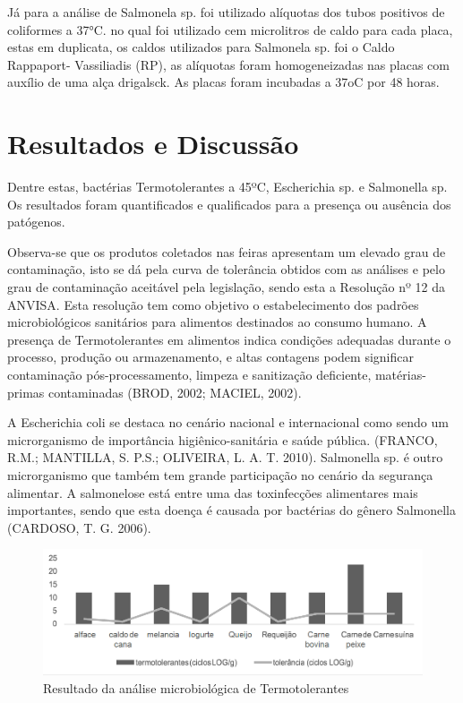 \documentclass[article,12pt,onesidea,4paper,english,brazil]{abntex2}
\begin{document}
Já para a análise de Salmonela sp. foi utilizado alíquotas dos tubos positivos de coliformes a 37°C. no qual foi utilizado cem microlitros de caldo para cada placa, estas em duplicata, os caldos utilizados para Salmonela sp. foi o Caldo Rappaport- Vassiliadis (RP), as alíquotas foram homogeneizadas nas placas com auxílio de uma alça drigalsck. As placas foram incubadas a 37oC por 48 horas.
	
	\section*{Resultados e Discussão}
	
Dentre estas, bactérias Termotolerantes a 45ºC, Escherichia sp. e Salmonella sp. Os resultados foram quantificados e qualificados para a presença ou ausência dos patógenos.

Observa-se que os produtos coletados nas feiras apresentam um elevado grau de contaminação, isto se dá pela curva de tolerância obtidos com as análises e pelo grau de contaminação aceitável pela legislação, sendo esta a Resolução nº 12 da ANVISA. Esta resolução tem como objetivo o estabelecimento dos padrões microbiológicos sanitários para alimentos destinados ao consumo humano. A presença de Termotolerantes em alimentos indica condições adequadas durante o processo, produção ou armazenamento, e altas contagens podem significar contaminação pós-processamento, limpeza e sanitização deficiente, matérias-primas contaminadas (BROD, 2002; MACIEL, 2002).

A Escherichia coli se destaca no cenário nacional e internacional como sendo um microrganismo de importância higiênico-sanitária e saúde pública. (FRANCO, R.M.; MANTILLA, S. P.S.; OLIVEIRA, L. A. T. 2010). Salmonella sp. é outro
microrganismo que também tem grande participação no cenário da segurança alimentar. A salmonelose está entre uma das toxinfecções alimentares mais importantes, sendo que esta doença é causada por bactérias do gênero Salmonella (CARDOSO, T. G. 2006).

\begin{figure}[!h]
	\centering
	\includegraphics[width=.8\linewidth]{pip-167-01}
	\caption{Resultado da análise microbiológica de Termotolerantes}
\end{figure}
\end{document}
